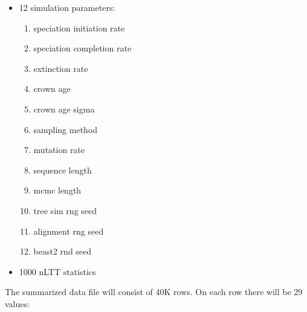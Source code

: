 \documentclass{article}
\begin{document}
\begin{itemize}  
  \item 12 simulation parameters:
  \begin{enumerate}  
    \item speciation initiation rate
    \item speciation completion rate
    \item extinction rate
    \item crown age
    \item crown age sigma
    \item sampling method
    \item mutation rate
    \item sequence length
    \item mcmc length
    \item tree sim rng seed
    \item alignment rng seed
    \item beast2 rnd seed
  \end{enumerate}
  \item 1000 nLTT statistics
\end{itemize}

The summarized data file will consist of 40K rows. On each row there will be 29 values:
\end{document}
